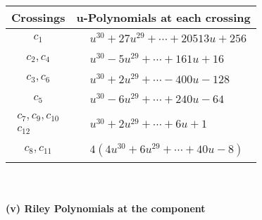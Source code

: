 \documentclass[1p]{elsarticle_modified}
\theoremstyle{definition}
\begin{document}
\begin{tabular}{m{50pt}|m{274pt}}
Crossings & \hspace{64pt}u-Polynomials at each crossing \\
\hline $$\begin{aligned}c_{1}\end{aligned}$$&$\begin{aligned}
&u^{30}+27 u^{29}+\cdots+20513 u+256
\end{aligned}$\\
\hline $$\begin{aligned}c_{2},c_{4}\end{aligned}$$&$\begin{aligned}
&u^{30}-5 u^{29}+\cdots+161 u+16
\end{aligned}$\\
\hline $$\begin{aligned}c_{3},c_{6}\end{aligned}$$&$\begin{aligned}
&u^{30}+2 u^{29}+\cdots-400 u-128
\end{aligned}$\\
\hline $$\begin{aligned}c_{5}\end{aligned}$$&$\begin{aligned}
&u^{30}-6 u^{29}+\cdots+240 u-64
\end{aligned}$\\
\hline $$\begin{aligned}c_{7},c_{9},c_{10}\\c_{12}\end{aligned}$$&$\begin{aligned}
&u^{30}+2 u^{29}+\cdots+6 u+1
\end{aligned}$\\
\hline $$\begin{aligned}c_{8},c_{11}\end{aligned}$$&$\begin{aligned}
&4(4 u^{30}+6 u^{29}+\cdots+40 u-8)
\end{aligned}$\\
\hline
\end{tabular}\\~\\
\newpage\renewcommand{\arraystretch}{1}
\flushleft \textbf{(v) Riley Polynomials at the component}\newline \\
\end{document}
